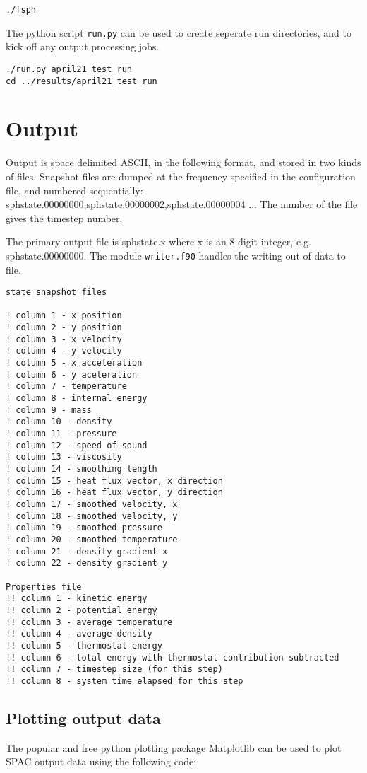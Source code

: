 \begin{verbatim}
./fsph
\end{verbatim}

The python script \texttt{run.py} can be used to create seperate run directories, and to
kick off any output processing jobs.

\begin{verbatim}
./run.py april21_test_run
cd ../results/april21_test_run
\end{verbatim}

\section{Output}
Output is space delimited ASCII, in the following format, and stored in two
kinds of files.  Snapshot files are dumped at the frequency specified in the
configuration file, and numbered sequentially:
sphstate.00000000,sphstate.00000002,sphstate.00000004 ... The number of the
file gives the timestep number.

The primary output file is sphstate.x where x is an 8 digit integer, e.g.
sphstate.00000000.  The module \texttt{writer.f90} handles the writing out of
data to file.

\begin{verbatim}
state snapshot files

! column 1 - x position
! column 2 - y position 
! column 3 - x velocity
! column 4 - y velocity
! column 5 - x acceleration
! column 6 - y aceleration
! column 7 - temperature
! column 8 - internal energy
! column 9 - mass
! column 10 - density
! column 11 - pressure
! column 12 - speed of sound
! column 13 - viscosity
! column 14 - smoothing length
! column 15 - heat flux vector, x direction
! column 16 - heat flux vector, y direction
! column 17 - smoothed velocity, x
! column 18 - smoothed velocity, y
! column 19 - smoothed pressure
! column 20 - smoothed temperature
! column 21 - density gradient x
! column 22 - density gradient y

Properties file
!! column 1 - kinetic energy
!! column 2 - potential energy 
!! column 3 - average temperature
!! column 4 - average density
!! column 5 - thermostat energy 
!! column 6 - total energy with thermostat contribution subtracted 
!! column 7 - timestep size (for this step)
!! column 8 - system time elapsed for this step

\end{verbatim}

\subsection{Plotting output data}
The popular and free python plotting package Matplotlib can be used to plot
SPAC output data using the following code:

